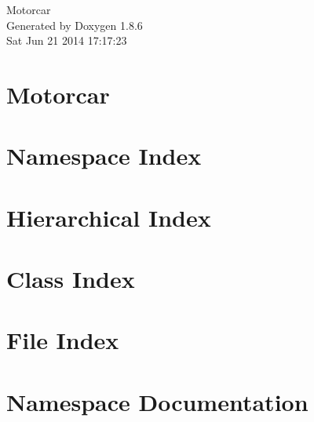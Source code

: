 \documentclass[twoside]{book}
\newcommand{\clearemptydoublepage}{%
  \newpage{\pagestyle{empty}\cleardoublepage}%
}
\begin{document}
\hypersetup{pageanchor=false}
\begin{titlepage}
\vspace*{7cm}
\begin{center}%
{\Large Motorcar }\\
\vspace*{1cm}
{\large Generated by Doxygen 1.8.6}\\
\vspace*{0.5cm}
{\small Sat Jun 21 2014 17:17:23}\\
\end{center}
\end{titlepage}
\clearemptydoublepage
\tableofcontents
\clearemptydoublepage
{}
\hypersetup{pageanchor=true}

\chapter{Motorcar}
\label{md__home_dave_thesis_motorcar_README}
\hypertarget{md__home_dave_thesis_motorcar_README}{}

\chapter{Namespace Index}

\chapter{Hierarchical Index}

\chapter{Class Index}

\chapter{File Index}

\chapter{Namespace Documentation}


\end{document}
